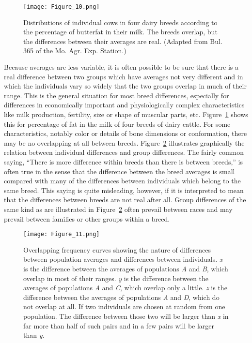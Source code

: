 \begin{figure}
	\centering
    \texttt{[image: Figure\_10.png]}
    \caption{Distributions of individual cows in four dairy breeds according to the
			 percentage of butterfat in their milk. The breeds overlap, but the differences between
			 their averages are real. (Adapted from Bul. 365 of the Mo. Agr. Exp. Station.)}
    \label{fig:Lush_Figure_10}
\end{figure}

Because averages are less variable, it is often possible to be sure that
there is a real difference between two groups which have averages not
very different and in which the individuals vary so widely that the two
groups overlap in much of their range. This is the general situation for
most breed differences, especially for differences in economically important
and physiologically complex characteristics like milk production,
fertility, size or shape of muscular parts, etc. Figure~\ref{fig:Lush_Figure_10} shows this for
percentage of fat in the milk of four breeds of dairy cattle. For some
characteristics, notably color or details of bone dimensions or conformation,
there may be no overlapping at all between breeds. Figure~\ref{fig:Lush_Figure_11}
illustrates graphically the relation between individual differences and
group differences. The fairly common saying, ``There is more difference
within breeds than there is between breeds,'' is often true in the sense
that the difference between the breed averages is small compared with
many of the differences between individuals which belong to the same
breed. This saying is quite misleading, however, if it is interpreted to
mean that the differences between breeds are not real after all. Group
differences of the same kind as are illustrated in Figure~\ref{fig:Lush_Figure_11} often prevail
between races and may prevail between families or other groups
within a breed.

\begin{figure}
	\centering
    \texttt{[image: Figure\_11.png]}
    \caption{Overlapping frequency curves showing the nature of differences between
			population averages and differences between individuals. \textit{x} is
			the difference between the averages of populations \textit{A} and
			\textit{B}, which overlap in most of their ranges. \textit{y} is the
			difference between the averages of populations \textit{A} and
			\textit{C}, which overlap only a little. \textit{z} is the difference
			between the averages of populations \textit{A} and \textit{D}, which do
			not overlap at all. If two individuals are chosen at random from one
			population. The difference between those two will be larger than
			\textit{x} in far more than half of such pairs and in a few pairs will
			be larger than \textit{y}.}
    \label{fig:Lush_Figure_11}
\end{figure}

